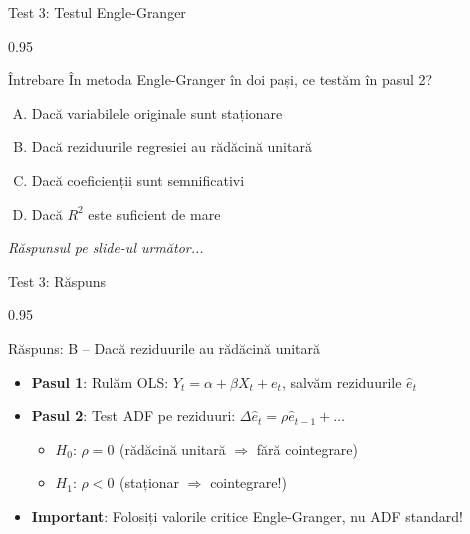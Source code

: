 \documentclass[9pt, aspectratio=169, t]{beamer}
\begin{document}
\begin{frame}{Test 3: Testul Engle-Granger}
    \begin{cminipage}{0.95\textwidth}
    \begin{alertblock}{Întrebare}
        În metoda Engle-Granger în doi pași, ce testăm în pasul 2?
    \end{alertblock}

    \vspace{0.3cm}

    \begin{enumerate}[A)]\setlength{\itemsep}{0pt}
        \item Dacă variabilele originale sunt staționare
        \item Dacă reziduurile regresiei au rădăcină unitară
        \item Dacă coeficienții sunt semnificativi
        \item Dacă $R^2$ este suficient de mare
    \end{enumerate}

    \vspace{0.5cm}
    \begin{flushright}\textit{Răspunsul pe slide-ul următor...}\end{flushright}
    \end{cminipage}
\end{frame}

\begin{frame}{Test 3: Răspuns}
    \begin{cminipage}{0.95\textwidth}
    \begin{exampleblock}{Răspuns: B -- Dacă reziduurile au rădăcină unitară}
        \begin{itemize}\setlength{\itemsep}{0pt}
            \item \textbf{Pasul 1}: Rulăm OLS: $Y_t = \alpha + \beta X_t + e_t$, salvăm reziduurile $\hat{e}_t$
            \item \textbf{Pasul 2}: Test ADF pe reziduuri: $\Delta \hat{e}_t = \rho \hat{e}_{t-1} + \ldots$
            \begin{itemize}\setlength{\itemsep}{0pt}
                \item $H_0$: $\rho = 0$ (rădăcină unitară $\Rightarrow$ fără cointegrare)
                \item $H_1$: $\rho < 0$ (staționar $\Rightarrow$ cointegrare!)
            \end{itemize}
            \item \textbf{Important}: Folosiți valorile critice Engle-Granger, nu ADF standard!
        \end{itemize}
    \end{exampleblock}
    \end{cminipage}
\end{frame}
\end{document}
